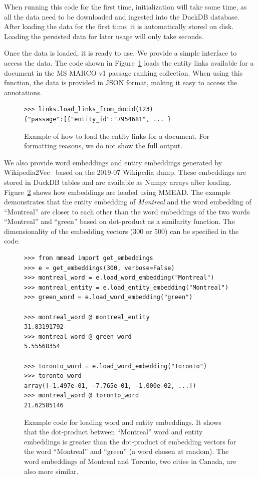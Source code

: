 When running this code for the first time, initialization will take some time, as all the data need to be downloaded and ingested into the DuckDB database. After loading the data for the first time, it is automatically stored on disk. Loading the persisted data for later usage will only take seconds.

Once the data is loaded, it is ready to use. We provide a simple interface to access the data. The code shown in Figure~\ref{fig:load-links-for-document} loads the entity links available for a document in the MS MARCO v1 passage ranking collection. When using this function, the data is provided in JSON format, making it easy to access the annotations.

\begin{figure}
\begin{verbatim}
>>> links.load_links_from_docid(123)
{"passage":[{"entity_id":"7954681", ... }
\end{verbatim}
	\caption{Example of how to load the entity links for a document. For formatting reasons, we do not show the full output. }
	\label{fig:load-links-for-document}
\end{figure}

We also provide word embeddings and entity embeddings generated by Wikipedia2Vec~\citep{wikipedia2vec} based on the 2019-07 Wikipedia dump. These embeddings are stored in DuckDB tables and are available as Numpy arrays after loading. Figure~\ref{fig:dot-product} shows how embeddings are loaded using MMEAD. The example demonstrates that the entity embedding of \emph{Montreal} and the word embedding of ``Montreal'' are closer to each other than the word embeddings of the two words ``Montreal'' and ``green'' based on dot-product as a similarity function. The dimensionality of the embedding vectors (300 or 500) can be specified in the code.

\begin{figure}
	\begin{verbatim}
>>> from mmead import get_embeddings
>>> e = get_embeddings(300, verbose=False)
>>> montreal_word = e.load_word_embedding("Montreal")
>>> montreal_entity = e.load_entity_embedding("Montreal")
>>> green_word = e.load_word_embedding("green")

>>> montreal_word @ montreal_entity
31.83191792
>>> montreal_word @ green_word
5.55568354

>>> toronto_word = e.load_word_embedding("Toronto")
>>> toronto_word
array([-1.497e-01, -7.765e-01, -1.000e-02, ...])
>>> montreal_word @ toronto_word
21.62585146
	\end{verbatim}
	\caption{Example code for loading word and entity embeddings. It shows that the dot-product between ``Montreal'' word and entity embeddings is greater than the dot-product of embedding vectors for the word ``Montreal'' and ``green'' (a word chosen at random). The word embeddings of Montreal and Toronto, two cities in Canada, are also more similar.}
	\label{fig:dot-product}
\end{figure}

